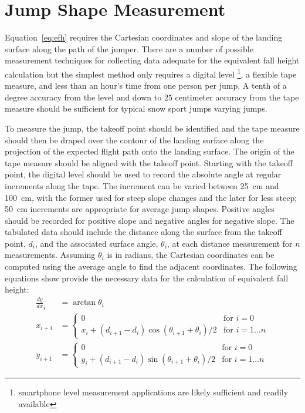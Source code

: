 \documentclass{article}
\begin{document}
\section{Jump Shape Measurement}
\label{sec:jump-shape-measurement}
%
Equation~\ref{eq:efh} requires the Cartesian coordinates and slope of the
landing surface along the path of the jumper. There are a number of possible
measurement techniques for collecting data adequate for the equivalent fall
height calculation but the simplest method only requires a digital level
\footnote{smartphone level measurement applications are likely sufficient and
readily available}, a flexible tape measure, and less than an hour's time from
one person per jump. A tenth of a degree accuracy from the level and down to 25
centimeter accuracy from the tape measure should be sufficient for typical snow
sport jumps varying jumps.

To measure the jump, the takeoff point should be identified and the tape
measure should then be draped over the contour of the landing surface along the
projection of the expected flight path onto the landing surface. The origin of
the tape measure should be aligned with the takeoff point. Starting with the
takeoff point, the digital level should be used to record the absolute angle at
regular increments along the tape. The increment can be varied between
25~\si{\centi\meter} and 100~\si{\centi\meter}, with the former used for steep
slope changes and the later for less steep; 50~\si{\centi\meter} increments are
appropriate for average jump shapes. Positive angles should be recorded for
positive slope and negative angles for negative slope. The tabulated data
should include the distance along the surface from the takeoff point, $d_i$,
and the associated surface angle, $\theta_i$, at each distance measurement for
$n$ measurements. Assuming $\theta_i$ is in radians, the Cartesian coordinates
can be computed using the average angle to find the adjacent coordinates. The
following equations show provide the necessary data for the calculation of
equivalent fall height:
%
\begin{align}
  \frac{dy}{dx}_{i} & = \arctan{\theta_i} \\
  x_{i + 1} & =
  \begin{cases}
    0 & \text{for } i=0 \\
    x_i + (d_{i+1} - d_i)\cos{(\theta_{i+1} + \theta_i)/2} &  \text{for } i=1\ldots n
  \end{cases} \\
  y_{i + 1} & =
  \begin{cases}
    0 & \text{for } i=0 \\
    y_i + (d_{i+1} - d_i)\sin{(\theta_{i+1} + \theta_i)/2} &  \text{for } i=1\ldots n
  \end{cases}
\end{align}
\end{document}
